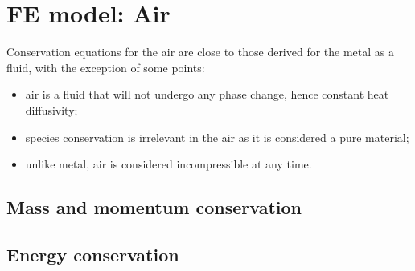 \section{FE model: Air}
Conservation equations for the air are close to those derived for the metal as a fluid, with the exception
of some points:
\begin{itemize}
\itemsep0em
\item air is a fluid that will not undergo any phase change, hence constant heat diffusivity;
\item species conservation is irrelevant in the air as it is considered a pure material;
\item unlike metal, air is considered incompressible at any time.
\end{itemize}

\subsection{Mass and momentum conservation}

\subsection{Energy conservation}

